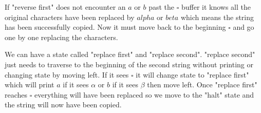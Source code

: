 \documentclass[12pt]{article}
\begin{document}
If "reverse first" does not encounter an $a$ or $b$ past the $\square$ buffer it knows all the original characters have been replaced by $alpha$ or $beta$ which means the string has been successfully copied. Now it must move back to the beginning $\square$ and go one by one replacing the characters.

We can have a state called "replace first" and "replace second". "replace second" just needs to traverse to the beginning of the second string without printing or changing state by moving left. If it sees $\square$ it will change state to "replace first" which will print $a$ if it sees $\alpha$ or $b$ if it sees $\beta$ then move left. Once "replace first" reaches $\square$ everything will have been replaced so we move to the "halt" state and the string will now have been copied.
\end{document}
